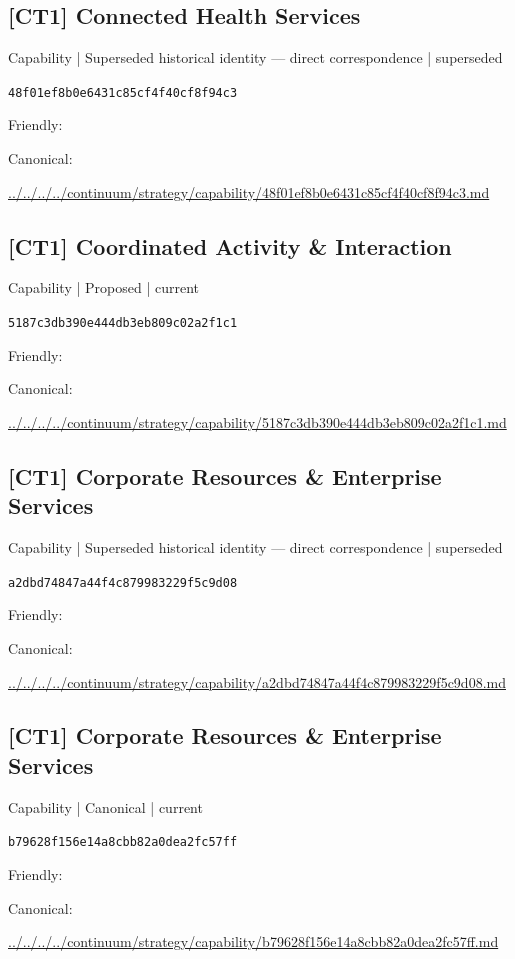 \documentclass[10pt,a4paper]{article}
\begin{document}
\subsection*{[CT1] Connected Health Services}
{\small Capability | Superseded historical identity — direct correspondence | superseded}\par
\texttt{48f01ef8b0e6431c85cf4f40cf8f94c3}\par
Friendly: \par
Canonical: \par
{\footnotesize\url{../../../../continuum/strategy/capability/48f01ef8b0e6431c85cf4f40cf8f94c3.md}}\par
\subsection*{[CT1] Coordinated Activity \& Interaction}
{\small Capability | Proposed | current}\par
\texttt{5187c3db390e444db3eb809c02a2f1c1}\par
Friendly: \par
Canonical: \par
{\footnotesize\url{../../../../continuum/strategy/capability/5187c3db390e444db3eb809c02a2f1c1.md}}\par
\subsection*{[CT1] Corporate Resources \& Enterprise Services}
{\small Capability | Superseded historical identity — direct correspondence | superseded}\par
\texttt{a2dbd74847a44f4c879983229f5c9d08}\par
Friendly: \par
Canonical: \par
{\footnotesize\url{../../../../continuum/strategy/capability/a2dbd74847a44f4c879983229f5c9d08.md}}\par
\subsection*{[CT1] Corporate Resources \& Enterprise Services}
{\small Capability | Canonical | current}\par
\texttt{b79628f156e14a8cbb82a0dea2fc57ff}\par
Friendly: \par
Canonical: \par
{\footnotesize\url{../../../../continuum/strategy/capability/b79628f156e14a8cbb82a0dea2fc57ff.md}}\par
\end{document}
